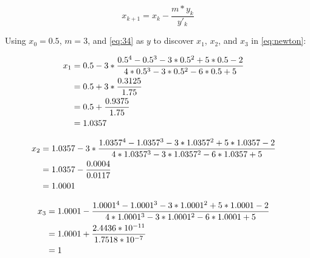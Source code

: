 		\begin{equation}
			x_{k+1} = x_{k} - \frac{m*y_{k}}{y'_{k}}
		\label{eq:1stnewton}
		\end{equation}

		Using $x_{0} = 0.5$, $m = 3$, and \cref{eq:34} as $y$ to discover $x_{1}$, $x_{2}$, and $x_{3}$ in \cref{eq:newton}:

		\begin{align}
			x_{1} &= 0.5 - 3*\frac{0.5^{4} - 0.5^{3} - 3*0.5^{2} + 5*0.5 - 2}{4*0.5^{3} - 3*0.5^{2} - 6*0.5 + 5}& \notag \\
			&= 0.5 + 3*\frac{0.3125}{1.75} & \notag \\
			&= 0.5 + \frac{0.9375}{1.75} & \notag \\
			&= 1.0357&
			\label{eq:34bx1}
		\end{align}

		\begin{align}
			x_{2} &= 1.0357 - 3*\frac{1.0357^{4} - 1.0357^{3} - 3*1.0357^{2} + 5*1.0357 - 2}{4*1.0357^{3} - 3*1.0357^{2} - 6*1.0357 + 5}& \notag \\
			&= 1.0357 - \frac{0.0004}{0.0117} & \notag \\
			&= 1.0001&
			\label{eq:34bx2}
		\end{align}

		\begin{align}
			x_{3} &= 1.0001 - \frac{1.0001^{4} - 1.0001^{3} - 3*1.0001^{2} + 5*1.0001 - 2}{4*1.0001^{3} - 3*1.0001^{2} - 6*1.0001 + 5}& \notag \\
			&= 1.0001 + \frac{2.4436 * 10^{-11}}{1.7518 * 10^{-7}} & \notag \\
			&= 1&
			\label{eq:34bx3}
		\end{align}
